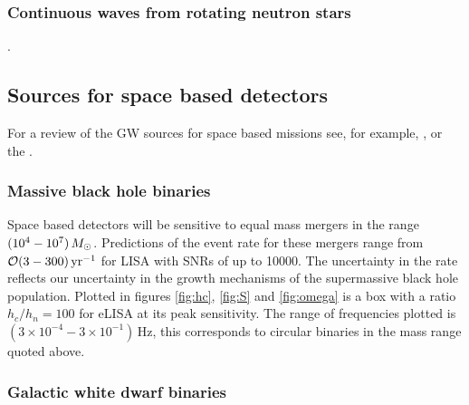 \subsubsection{Continuous waves from rotating neutron stars}

{}.


\subsection{Sources for space based detectors}
For a review of the GW sources for space based missions see, for example, \cite{Amaro-Seoane-et-al}, \cite{Gairetal} or the \cite{eLISAyellowbook}.


\subsubsection{Massive black hole binaries}
Space based detectors will be sensitive to equal mass mergers in the range $(10^{4}-10^{7})\,M_{ \odot }$. Predictions of the event rate for these mergers range from ${\cal{O}}(3-300)\,\textrm{yr}^{-1}$ for LISA with SNRs of up to 10000. The uncertainty in the rate reflects our uncertainty in the growth mechanisms of the supermassive black hole population. Plotted in figures \ref{fig:hc}, \ref{fig:S} and \ref{fig:omega} is a box with a ratio $h_{c}/h_{n}=100$ for eLISA at its peak sensitivity. The range of frequencies plotted is $(3\times 10^{-4}-3\times 10^{-1})\,\textrm{Hz}$, this corresponds to circular binaries in the mass range quoted above.

\subsubsection{Galactic white dwarf binaries} \label{sec:GB}


